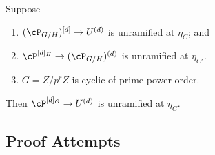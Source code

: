\begin{theorem}\label{thm:main}
Suppose
\begin{enumerate}
  \item[\textnormal{(H1)}] $(\cP_{G/H})^{[d]} \to U^{(d)}$ is unramified at
        $\eta_C$; and
  \item[\textnormal{(H2)}] $\cP^{[d]_H} \to (\cP_{G/H})^{(d)}$ is unramified
        at $\eta_{C'}$.
  \item [\textnormal{(H3)}]$G=Z/p^rZ$ is cyclic of prime power order.
\end{enumerate}
Then $\cP^{[d]_G} \to U^{(d)}$ is unramified at $\eta_C$.
\end{theorem}

\subsection{Proof Attempts}

